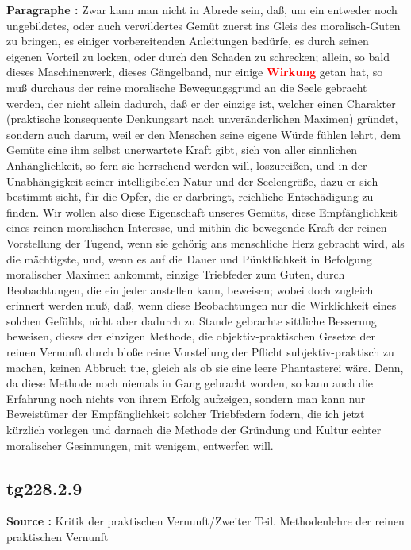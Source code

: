 \documentclass[a4paper,12pt,twoside]{book}
\newcommand{\match}[1]{\textcolor{red}{\textbf{#1}}}
\begin{document}
	\noindent\textbf{Paragraphe : }Zwar kann man nicht in Abrede sein, daß, um ein entweder noch ungebildetes, oder auch verwildertes Gemüt zuerst ins Gleis des moralisch-Guten zu bringen, es einiger vorbereitenden Anleitungen bedürfe, es durch seinen eigenen Vorteil zu locken, oder durch den Schaden zu schrecken; allein, so bald dieses Maschinenwerk, dieses Gängelband, nur einige \match{Wirkung} getan hat, so muß durchaus der reine moralische Bewegungsgrund an die Seele gebracht werden, der nicht allein dadurch, daß er der einzige ist, welcher einen Charakter (praktische konsequente Denkungsart nach unveränderlichen Maximen) gründet, sondern auch darum, weil er den Menschen seine eigene Würde fühlen lehrt, dem Gemüte eine ihm selbst unerwartete Kraft gibt, sich von aller sinnlichen Anhänglichkeit, so fern sie herrschend werden will, loszureißen, und in der Unabhängigkeit seiner intelligibelen Natur und der Seelengröße, dazu er sich bestimmt sieht, für die Opfer, die er darbringt, reichliche Entschädigung zu finden. Wir wollen also diese Eigenschaft unseres Gemüts, diese Empfänglichkeit eines reinen moralischen Interesse, und mithin die bewegende Kraft der reinen Vorstellung der Tugend, wenn sie gehörig ans menschliche Herz gebracht wird, als die mächtigste, und, wenn es auf die Dauer und Pünktlichkeit in Befolgung moralischer Maximen ankommt, einzige Triebfeder zum Guten, durch Beobachtungen, die ein jeder anstellen kann, beweisen; wobei doch zugleich erinnert werden muß, daß, wenn diese Beobachtungen nur die Wirklichkeit eines solchen Gefühls, nicht aber dadurch zu Stande gebrachte sittliche Besserung beweisen, dieses der einzigen Methode, die objektiv-praktischen Gesetze der reinen Vernunft durch bloße reine Vorstellung der Pflicht subjektiv-praktisch zu machen, keinen Abbruch tue, gleich als ob sie eine leere Phantasterei wäre. Denn, da diese Methode noch niemals in Gang gebracht worden, so kann auch die Erfahrung noch nichts von ihrem Erfolg aufzeigen, sondern man kann nur Beweistümer der Empfänglichkeit solcher Triebfedern fodern, die ich jetzt kürzlich vorlegen und darnach die Methode der Gründung und Kultur echter moralischer Gesinnungen, mit wenigem, entwerfen will. 
	
	\subsection*{tg228.2.9} 
	\textbf{Source : }Kritik der praktischen Vernunft/Zweiter Teil. Methodenlehre der reinen praktischen Vernunft\\  
	
\end{document}
